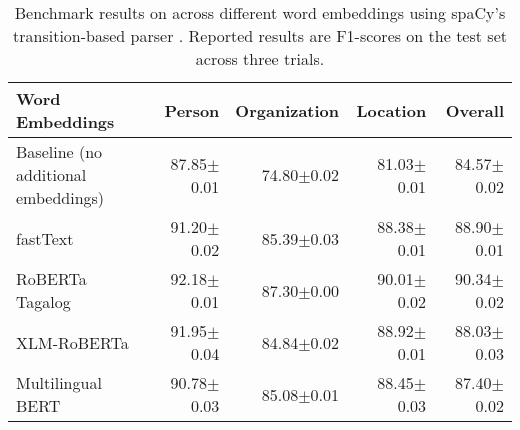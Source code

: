 \documentclass[../report.tex]{subfiles}
\begin{document}
\begin{table*}[t]
\centering
\begin{tabular}{@{}lrrrr@{}}
\toprule
Word Embeddings & Person & Organization &  Location  & Overall       \\ \midrule
Baseline (no additional embeddings)          & 87.85$\pm$0.01 & 74.80$\pm$0.02 & 81.03$\pm$0.01 & 84.57$\pm$0.02 \\
fastText  \cite{Bojanowski2016EnrichingWV}   & 91.20$\pm$0.02 & 85.39$\pm$0.03 & 88.38$\pm$0.01 & 88.90$\pm$0.01 \\
RoBERTa Tagalog \cite{Cruz2021ImprovingLL}   & 92.18$\pm$0.01 & 87.30$\pm$0.00 & 90.01$\pm$0.02 & 90.34$\pm$0.02 \\
XLM-RoBERTa \cite{Conneau2019UnsupervisedCR} & 91.95$\pm$0.04 & 84.84$\pm$0.02 & 88.92$\pm$0.01 & 88.03$\pm$0.03\\
Multilingual BERT \cite{Devlin2019BERTPO}    & 90.78$\pm$0.03 & 85.08$\pm$0.01 & 88.45$\pm$0.03 & 87.40$\pm$0.02 \\
\bottomrule
\end{tabular}
\caption{
    Benchmark results on \tlunified{} across different word embeddings using spaCy's transition-based parser \cite{Honnibal2020Spacy}.
    Reported results are F1-scores on the test set across three trials.
}
\label{table:results_baseline}
\end{table*}
\end{document}
